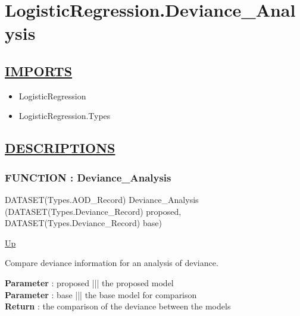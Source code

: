 \chapter*{LogisticRegression.Deviance\_Analysis}
\hypertarget{ecldoc:toc:LogisticRegression.Deviance_Analysis}{}

\section*{\underline{IMPORTS}}
\begin{itemize}
\item LogisticRegression
\item LogisticRegression.Types
\end{itemize}

\section*{\underline{DESCRIPTIONS}}
\subsection*{FUNCTION : Deviance\_Analysis}
\hypertarget{ecldoc:logisticregression.deviance_analysis}{}
\begin{minipage}[t]{\textwidth}
\begin{flushleft}
DATASET(Types.AOD\_Record) Deviance\_Analysis (DATASET(Types.Deviance\_Record) proposed, DATASET(Types.Deviance\_Record) base)
\end{flushleft}
\end{minipage}
\hyperlink{ecldoc:toc:LogisticRegression}{Up}

\par
Compare deviance information for an analysis of deviance.
\par
\textbf{Parameter} : proposed ||| the proposed model \\
\textbf{Parameter} : base ||| the base model for comparison \\
\textbf{Return} : the comparison of the deviance between the models \\
